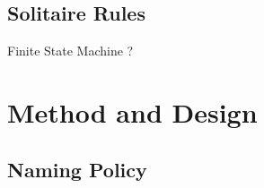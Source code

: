 \documentclass[runningheads,a4paper]{llncs}
\begin{document}
\subsection{Solitaire Rules}

Finite State Machine ?


\section{Method and Design}
\label{sec:2_method_and_design}
\subsection{Naming Policy}
\end{document}
